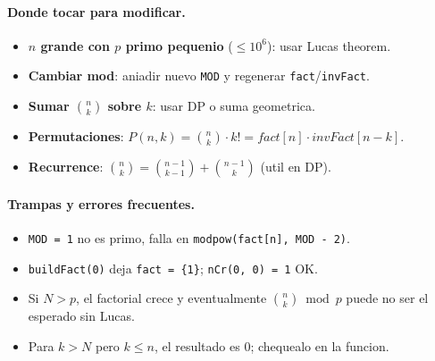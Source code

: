 \paragraph{Donde tocar para modificar.}
\begin{itemize}\setlength\itemsep{0pt}
	\item \textbf{$n$ grande con $p$ primo pequenio} ($\le 10^6$): usar Lucas theorem.
	\item \textbf{Cambiar mod}: aniadir nuevo \texttt{MOD} y regenerar \texttt{fact}/\texttt{invFact}.
	\item \textbf{Sumar $\binom{n}{k}$ sobre $k$}: usar DP o suma geometrica.
	\item \textbf{Permutaciones}: $P(n, k) = \binom{n}{k} \cdot k! = fact[n] \cdot invFact[n-k]$.
	\item \textbf{Recurrence}: $\binom{n}{k} = \binom{n-1}{k-1} + \binom{n-1}{k}$ (util en DP).
\end{itemize}

\paragraph{Trampas y errores frecuentes.}
\begin{itemize}\setlength\itemsep{0pt}
	\item \texttt{MOD = 1} no es primo, falla en \texttt{modpow(fact[n], MOD - 2)}.
	\item \texttt{buildFact(0)} deja \texttt{fact = \{1\}}; \texttt{nCr(0, 0) = 1} OK.
	\item Si $N > p$, el factorial crece y eventualmente $\binom{n}{k} \bmod p$ puede no ser el esperado sin Lucas.
	\item Para $k > N$ pero $k \le n$, el resultado es $0$; chequealo en la funcion.
\end{itemize}

